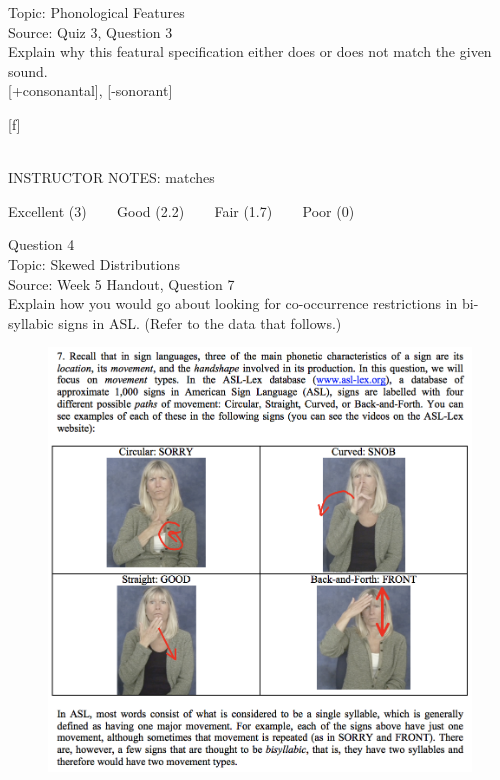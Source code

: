 \documentclass[12pt]{article}
\begin{document}
Topic: Phonological Features\\
Source: Quiz 3, Question 3\\

Explain why this featural specification either does or does not match the given sound.\\

{[+consonantal]}, {[-sonorant]}

{[f]}


~\\
INSTRUCTOR NOTES: matches


\vfill
Excellent (3) ~~~ Good (2.2) ~~~ Fair (1.7) ~~~ Poor (0)
\newpage

{\large Question 4}\\

Topic: Skewed Distributions\\
Source: Week 5 Handout, Question 7\\

Explain how you would go about looking for co-occurrence restrictions in bi-syllabic signs in ASL. (Refer to the data that follows.)\\

\begin{figure}[H]
\includegraphics{../images/ASL_movement.png}
\end{figure}
\end{document}
